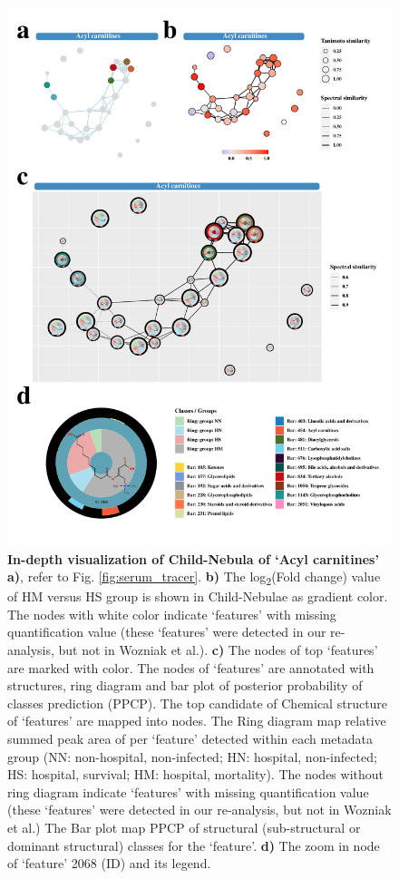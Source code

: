 \documentclass[
]{article}
\begin{document}
\begin{figure}
\hypertarget{fig:ac_node2}{%
\centering
\includegraphics{fig5.ac_node2.pdf}
\caption{\textbf{In-depth visualization of Child-Nebula of `Acyl
carnitines'} \textbf{a)}, refer to Fig.
{\protect\NoHyper\ref{fig:serum_tracer}\protect\endNoHyper}. \textbf{b)}
The log\textsubscript{2}(Fold change) value of HM versus HS group is
shown in Child-Nebulae as gradient color. The nodes with white color
indicate `features' with missing quantification value (these `features'
were detected in our re-analysis, but not in Wozniak et al.).
\textbf{c)} The nodes of top `features' are marked with color. The nodes
of `features' are annotated with structures, ring diagram and bar plot
of posterior probability of classes prediction (PPCP). The top candidate
of Chemical structure of `features' are mapped into nodes. The Ring
diagram map relative summed peak area of per `feature' detected within
each metadata group (NN: non-hospital, non-infected; HN: hospital,
non-infected; HS: hospital, survival; HM: hospital, mortality). The
nodes without ring diagram indicate `features' with missing
quantification value (these `features' were detected in our re-analysis,
but not in Wozniak et al.) The Bar plot map PPCP of structural
(sub-structural or dominant structural) classes for the `feature'.
\textbf{d)} The zoom in node of `feature' 2068 (ID) and its
legend.}\label{fig:ac_node2}
}
\end{figure}
\end{document}
